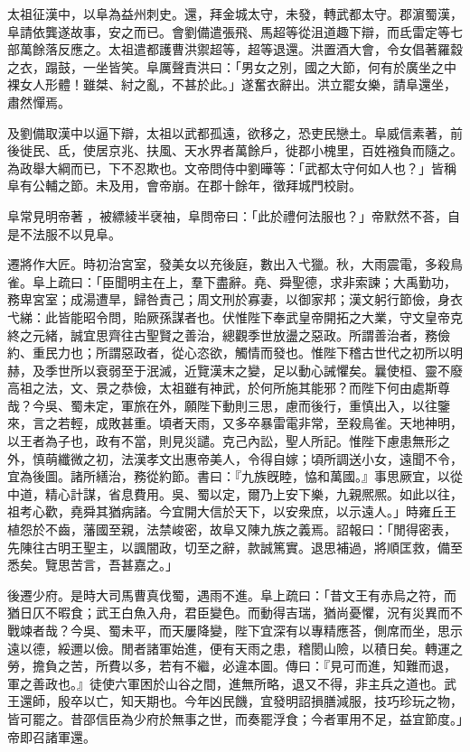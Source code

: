 \begin{pinyinscope}
 
 
 
 太祖征漢中，以阜為益州刺史。還，拜金城太守，未發，轉武都太守。郡濵蜀漢，阜請依龔遂故事，安之而已。會劉備遣張飛、馬超等從沮道趣下辯，而氐雷定等七部萬餘落反應之。太祖遣都護曹洪禦超等，超等退還。洪置酒大會，令女倡著羅縠之衣，蹋鼓，一坐皆笑。阜厲聲責洪曰：「男女之別，國之大節，何有於廣坐之中裸女人形體！雖桀、紂之亂，不甚於此。」遂奮衣辭出。洪立罷女樂，請阜還坐，肅然憚焉。
 
 
 
 
 及劉備取漢中以逼下辯，太祖以武都孤遠，欲移之，恐吏民戀土。阜威信素著，前後徙民、氐，使居京兆、扶風、天水界者萬餘戶，徙郡小槐里，百姓襁負而隨之。為政舉大綱而已，下不忍欺也。文帝問侍中劉曄等：「武都太守何如人也？」皆稱阜有公輔之節。未及用，會帝崩。在郡十餘年，徵拜城門校尉。
 
 
 
 
 阜常見明帝著𧛕，被縹綾半裦袖，阜問帝曰：「此於禮何法服也？」帝默然不荅，自是不法服不以見阜。
 
 
 
 
 遷將作大匠。時初治宮室，發美女以充後庭，數出入弋獵。秋，大雨震電，多殺鳥雀。阜上疏曰：「臣聞明主在上，羣下盡辭。堯、舜聖德，求非索諫；大禹勤功，務卑宮室；成湯遭旱，歸咎責己；周文刑於寡妻，以御家邦；漢文躬行節儉，身衣弋綈：此皆能昭令問，貽厥孫謀者也。伏惟陛下奉武皇帝開拓之大業，守文皇帝克終之元緒，誠宜思齊往古聖賢之善治，總觀季世放盪之惡政。所謂善治者，務儉約、重民力也；所謂惡政者，從心恣欲，觸情而發也。惟陛下稽古世代之初所以明赫，及季世所以衰弱至于泯滅，近覽漢末之變，足以動心誡懼矣。曩使桓、靈不廢高祖之法，文、景之恭儉，太祖雖有神武，於何所施其能邪？而陛下何由處斯尊哉？今吳、蜀未定，軍旅在外，願陛下動則三思，慮而後行，重慎出入，以往鑒來，言之若輕，成敗甚重。頃者天雨，又多卒暴雷電非常，至殺鳥雀。天地神明，以王者為子也，政有不當，則見災譴。克己內訟，聖人所記。惟陛下慮患無形之外，慎萌纖微之初，法漢孝文出惠帝美人，令得自嫁；頃所調送小女，遠聞不令，宜為後圖。諸所繕治，務從約節。書曰：『九族旣睦，恊和萬國。』事思厥宜，以從中道，精心計謀，省息費用。吳、蜀以定，爾乃上安下樂，九親熈熈。如此以往，祖考心歡，堯舜其猶病諸。今宜開大信於天下，以安衆庶，以示遠人。」時雍丘王植怨於不齒，藩國至親，法禁峻密，故阜又陳九族之義焉。詔報曰：「閒得密表，先陳往古明王聖主，以諷闇政，切至之辭，款誠篤實。退思補過，將順匡救，備至悉矣。覽思苦言，吾甚嘉之。」
 
 
 
 
 後遷少府。是時大司馬曹真伐蜀，遇雨不進。阜上疏曰：「昔文王有赤烏之符，而猶日仄不暇食；武王白魚入舟，君臣變色。而動得吉瑞，猶尚憂懼，況有災異而不戰竦者哉？今吳、蜀未平，而天屢降變，陛下宜深有以專精應荅，側席而坐，思示遠以德，綏邇以儉。閒者諸軍始進，便有天雨之患，稽閡山險，以積日矣。轉運之勞，擔負之苦，所費以多，若有不繼，必違本圖。傳曰：『見可而進，知難而退，軍之善政也。』徒使六軍困於山谷之間，進無所略，退又不得，非主兵之道也。武王還師，殷卒以亡，知天期也。今年凶民饑，宜發明詔損膳減服，技巧珍玩之物，皆可罷之。昔邵信臣為少府於無事之世，而奏罷浮食；今者軍用不足，益宜節度。」帝即召諸軍還。
 

\end{pinyinscope}
